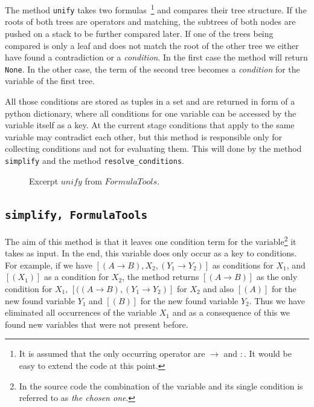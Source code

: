 The method \texttt{unify} takes two formulas~\footnote{It is assumed that the only occurring operator are $\rightarrow$ and $:$. It would be easy to extend the code at this point.} and compares their tree structure. If the roots of both trees are operators and matching, the subtrees of both nodes are pushed on a stack to be further compared later. If one of the trees being compared is only a leaf and does not match the root of the other tree we either have found a contradiction or a \emph{condition}. In the first case the method will return \texttt{None}. In the other case, the term of the second tree becomes a \emph{condition} for the variable of the first tree.

All those conditions are stored as tuples in a set and are returned in form of a python dictionary, where all conditions for one variable can be accessed by the variable itself as a key. At the current stage conditions that apply to the same variable may contradict each other, but this method is responsible only for collecting conditions and not for evaluating them. This will done by the method \texttt{simplify} and the method \texttt{resolve\_conditions}.

\begin{figure}[H]
	\caption{Excerpt $unify$ from $FormulaTools$.}
	\vspace{-10pt}
	
	\vspace{-10pt}
\end{figure}


\subsection[simplify]{\texttt{simplify, FormulaTools}}

The aim of this method is that it leaves one condition term for the variable\footnote{In the source code the combination of the variable and its single condition is referred to as \emph{the chosen one}.} it takes as input. In the end, this variable does only occur as a key to conditions. For example, if we have $ [(A \rightarrow B), X_2, (Y_1 \rightarrow Y_2)]$ as conditions for $X_1$, and $[(X_1)]$ as a condition for $X_2$, the method returns $[(A \rightarrow B)]$ as the only condition for $X_1$, $[((A \rightarrow B), (Y_1 \rightarrow Y_2)]$ for $X_2$ and also $[(A)]$ for the new found variable $Y_1$ and $[(B)]$ for the new found variable $Y_2$. Thus we have eliminated all occurrences of the variable $X_1$ and as a consequence of this we found new variables that were not present before. 

